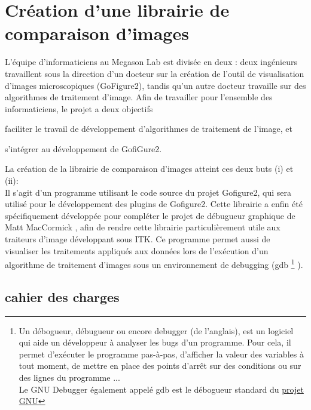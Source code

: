 

\section{Création d'une librairie de comparaison d'images}

L'équipe d'informaticiens au Megason Lab est divisée en deux : deux ingénieurs travaillent sous la direction d'un docteur sur la
 création de l'outil de visualisation d'images microscopiques (GoFigure2), tandis qu'un autre docteur travaille sur
 des algorithmes de traitement d'image. Afin de travailler pour l'ensemble des informaticiens, le projet a deux objectifs
\begin{inparaenum}[(i)]
  \item faciliter le travail de développement d'algorithmes de traitement de l'image, et 
  \item s'intégrer au développement de GofiGure2.
\end{inparaenum}

La création de la librairie de comparaison d'images atteint ces deux buts (i) et (ii):\\ 
Il s'agit d'un programme utilisant le code source du projet Gofigure2, 
qui sera utilisé pour le développement des plugins de Gofigure2.
Cette librairie a enfin été spécifiquement développée pour compléter le projet de débugueur graphique de 
Matt MacCormick \cite{McCornic-VisualDebug}, afin de rendre cette librairie particulièrement utile
aux traiteurs d'image développant sous ITK.
Ce programme permet aussi de visualiser les traitements appliqués aux données
lors de l'exécution d'un algorithme de traitement d'images sous un environnement de debugging (gdb
\footnote{Un débogueur, débugueur ou encore debugger (de l'anglais), est un logiciel qui aide un développeur à analyser les bugs d'un programme. Pour cela, il permet d'exécuter le programme pas-à-pas, d'afficher la valeur des variables à tout moment, de mettre en place des points d'arrêt sur des conditions ou sur des lignes du programme ...\\
Le GNU Debugger également appelé gdb est le débogueur standard du \href{http://fr.wikipedia.org/wiki/Projet_GNU}{projet GNU} } ).


\subsection{cahier des charges}


